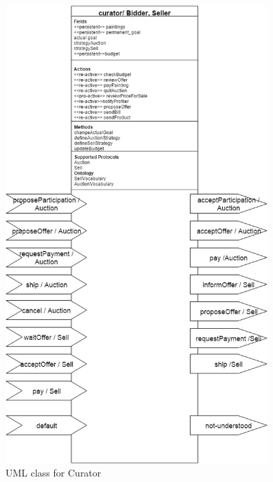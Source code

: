 \documentclass[a4paper,11pt]{report}
\begin{document}
   \begin{figure}[ht!]
    \centering
    \includegraphics[width=0.9\textwidth]{media/curator_class.png}
    \caption{UML class for Curator}
    \label{figure:classCurator}
   \end{figure}
   
\end{document}
